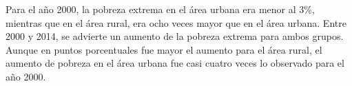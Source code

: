 Para el año 2000, la pobreza extrema en el área urbana era menor al 3\%, mientras que en el área rural, era ocho veces mayor que en el área urbana. Entre 2000 y 2014, se advierte un aumento de la pobreza extrema para ambos grupos. Aunque en puntos porcentuales fue mayor el aumento para el área rural, el aumento de pobreza en el área urbana fue casi cuatro veces lo observado para el año 2000.
